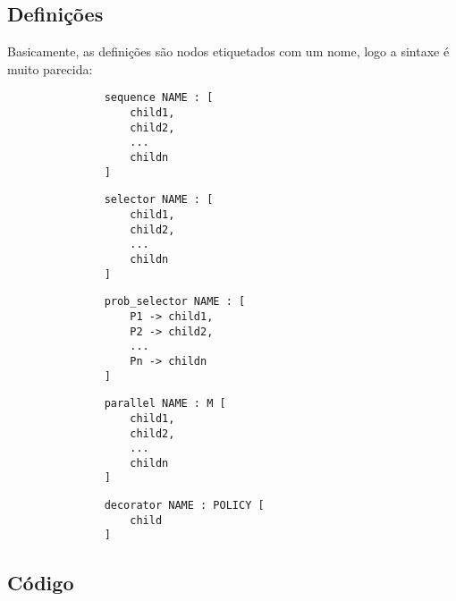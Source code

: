 \subsection{Definições}
Basicamente, as definições são nodos etiquetados com um nome, logo a sintaxe é muito parecida:
\begin{figure}[H]
\begin{subfigure}{0.45\linewidth}
\begin{lstlisting}
    sequence NAME : [
        child1,
        child2,
        ...
        childn
    ]
\end{lstlisting}
\end{subfigure}
\hfil
\begin{subfigure}{0.45\linewidth}
\begin{lstlisting}
    selector NAME : [
        child1,
        child2,
        ...
        childn
    ]
\end{lstlisting}
\end{subfigure}
\begin{subfigure}{0.45\linewidth}
\begin{lstlisting}
    prob_selector NAME : [
        P1 -> child1,
        P2 -> child2,
        ...
        Pn -> childn
    ]
\end{lstlisting}
\end{subfigure}
\hfil
\begin{subfigure}{0.45\linewidth}
\begin{lstlisting}
    parallel NAME : M [
        child1,
        child2,
        ...
        childn
    ]
\end{lstlisting}
\end{subfigure}
\begin{subfigure}{0.45\linewidth}
\begin{lstlisting}
    decorator NAME : POLICY [
        child
    ]
\end{lstlisting}
\end{subfigure}
\end{figure}
\subsection{Código}